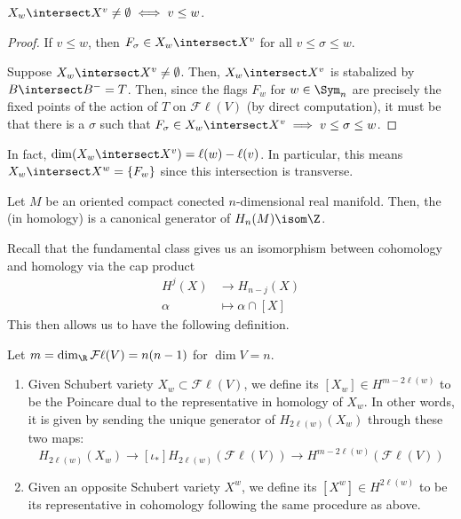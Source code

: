 \documentclass[11pt,leqno,oneside]{amsbook}
\numberwithin{thm}{section}
\newcommand{\Fl}{\mathcal{F\ell}}
\begin{document}
\begin{thm}
  \(X_w \intersect X^v \neq \emptyset \iff v \leq w\).
\end{thm}
\begin{proof}
  If \(v \leq w\), then \(F_\sigma \in X_w \intersect X^v\) for all
  \(v \leq \sigma \leq w\).

  Suppose \(X_w \intersect X^v \neq \emptyset\). Then, \(X_w
  \intersect X^v\) is stabalized by \(B \intersect B^- = T\). Then,
  since the flags \(F_w\) for \(w \in \Sym_n\) are precisely the fixed
  points of the action of \(T\) on \(\Fl(V)\) (by direct computation),
  it must be that there 
  is a \(\sigma\) such that \(F_\sigma \in X_w \intersect X^v \implies
  v \leq \sigma \leq w\).
\end{proof}
\begin{rmk}
  In fact, \(\dim(X_w \intersect X^v) = \ell(w) - \ell(v)\). In
  particular, this means \(X_w \intersect X^w = \{F_w\}\) since this
  intersection is transverse. 
\end{rmk}
\begin{defn}
  Let \(M\) be an oriented compact conected \(n\)-dimensional real
  manifold. Then, the  (in homology) is
  a canonical generator of \(H_n(M) \isom \Z\).
\end{defn}
Recall that the fundamental class gives us an isomorphism between
cohomology and homology via the cap product
\begin{align*}
  H^j(X) & \to H_{n-j}(X) \\
  \alpha & \mapsto \alpha \cap [X]
\end{align*}
This then allows us to have the following definition.
\begin{defn}
  Let \(m = \dim_\R \Fl(V) = n(n-1)\) for \(\dim V = n\).
  \begin{enumerate}
  \item Given Schubert variety \(X_w \subset \Fl(V)\), we define its
     \([X_w] \in H^{m-2\ell(w)}\) to be the
    Poincare dual to the representative in homology of \(X_w\). In
    other words, it is given by sending the unique generator of
    \(H_{2\ell(w)}(X_w)\) through these two maps: \[
      H_{2\ell(w)}(X_w) \to[\iota_*] H_{2\ell(w)}(\Fl(V)) \to H^{m-2\ell(w)}(\Fl(V))
    \]
  \item Given an opposite Schubert variety \(X^w\), we define its
     \([X^w] \in H^{2 \ell(w)}\) to be its
    representative in cohomology following the same procedure as
    above. 
  \end{enumerate}
\end{defn}
\end{document}
